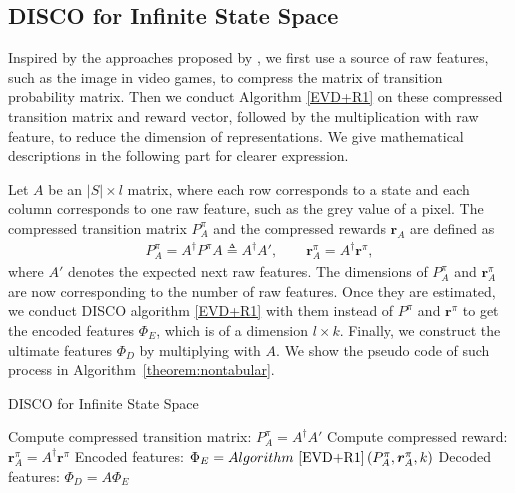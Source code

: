 \documentclass[onecolumn, conference]{IEEEtran}
\begin{document}
\subsection{DISCO for Infinite State Space}
\label{sec:big scale}
Inspired by the approaches proposed by \cite{Song2016LinearFE}\cite{Behzadian2019FeatureSB}, we first use a source of raw features, such as the image in video games, to compress the matrix of transition probability matrix. Then we conduct Algorithm \ref{EVD+R1} on these compressed transition matrix and reward vector, followed by the multiplication with raw feature, to reduce the dimension of representations. We give mathematical descriptions in the following part for clearer expression. 

Let $A$ be an $|S| \times l$ matrix, where each row corresponds to a state and each column corresponds to one raw feature, such as the grey value of a pixel. The compressed transition matrix $P^{\pi}_{A}$ and the compressed rewards $\boldsymbol{r}_A$ are defined as 
\begin{align*}
		P^{\pi}_A = A^{\dagger}P^\pi A \triangleq A^{\dagger} A' ,\quad\quad \boldsymbol{r}^{\pi}_A = A^{\dagger}\boldsymbol{r}^{\pi},
\end{align*}
where $A'$ denotes the expected next raw features. The dimensions of  $P^{\pi}_{A}$ and  $\boldsymbol{r}^{\pi}_A$ are now corresponding to the number of raw features. Once they are estimated, we conduct DISCO algorithm \ref{EVD+R1} with them instead of  $P^{\pi}$ and $\boldsymbol{r}^{\pi}$ to get the encoded features $\Phi_{E}$, which is of a dimension $l \times k$. Finally, we construct the ultimate features $\Phi_D$ by multiplying with $A$. We show the pseudo code of such process in Algorithm~\ref{theorem:nontabular}.  

\begin{algorithm}[H]
        \caption{DISCO for Infinite State Space}\label{EVD+R2}
        Compute compressed transition matrix: $P^{\pi}_A = A^\dagger A'$\;
        Compute compressed reward: $\boldsymbol{r}^{\pi}_A = A^\dagger \boldsymbol{r}^\pi$\;
        Encoded features: $\Phi_E = Algorithm~\ref{EVD+R1}\left(P^{\pi}_A, \boldsymbol{r}^{\pi}_A, k \right)${\color{blue} }
        Decoded features: $\Phi_D = A\Phi_E${\color{blue}}
\end{algorithm}
\end{document}
